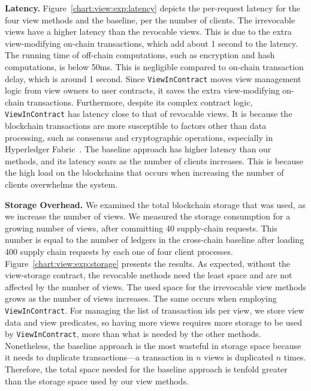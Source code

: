 \medskip
\noindent
\textbf{Latency.}
Figure~\ref{chart:view:exp:latency} depicts the per-request latency for the four view methods and the baseline, per the number of clients. 
The irrevocable views have a higher latency than the revocable views. This is due to the extra view-modifying on-chain transactions, which add about 1 second to the latency. The running time of off-chain computations, such as encryption and hash computations, is below 50ms.
This is negligible compared to on-chain transaction delay, which is around 1 second. 
Since \texttt{ViewInContract} moves  view management logic from view owners to user contracts, it saves the extra view-modifying on-chain transactions. Furthermore, despite its complex contract logic, \texttt{ViewInContract} has latency close to that of revocable views. It is because the blockchain transactions are more susceptible to factors other than data processing, such as consensus and cryptographic operations, especially in Hyperledger Fabric~\cite{sharma2019blurring}. 
The baseline approach has higher latency than our methods, and its latency soars as the number of clients increases. This is because the high load on the blockchains that occurs when increasing the number of clients overwhelms the system. 



\medskip
\noindent
\textbf{Storage Overhead.}
We examined the total blockchain storage that was used, as we increase the number of views. 
We measured the storage consumption for a growing number of views, after committing 40 supply-chain requests. 
This number is equal to the number of ledgers in the cross-chain baseline after loading 400 supply chain requests by each one of four client processes. 
Figure~\ref{chart:view:exp:storage} presents the results. 
As expected, without the view-storage contract, the revocable methods need the least space and are not affected by the number of views. 
The used space for the irrevocable view methods grows as the number of views increases.
The same occurs when employing \texttt{ViewInContract}. For managing the list of transaction ids per view, we store view data and view predicates, so having more views requires more storage to be used by \texttt{ViewInContract}, more than what is needed by the other methods.
Nonetheless, the baseline approach is the most wasteful in storage space because it needs to duplicate transactions---a transaction in $n$ views is duplicated $n$ times. Therefore, the total space needed for the baseline approach is tenfold greater than the storage space used by our view methods. 


